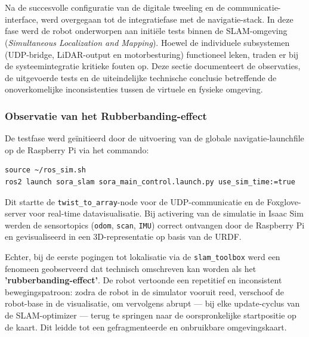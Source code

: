 \chapter{}%
\label{ch:diagnostische_analyse}

Na de succesvolle configuratie van de digitale tweeling en de communicatie-interface, werd overgegaan tot de integratiefase met de navigatie-stack. In deze fase werd de robot onderworpen aan initiële tests binnen de SLAM-omgeving (\textit{Simultaneous Localization and Mapping}). Hoewel de individuele subsystemen (UDP-bridge, LiDAR-output en motorbesturing) functioneel leken, traden er bij de systeemintegratie kritieke fouten op. Deze sectie documenteert de observaties, de uitgevoerde tests en de uiteindelijke technische conclusie betreffende de onoverkomelijke inconsistenties tussen de virtuele en fysieke omgeving.

\subsection{Observatie van het Rubberbanding-effect}
\label{subsec:observatie_rubberbanding}

De testfase werd geïnitieerd door de uitvoering van de globale navigatie-launchfile op de Raspberry Pi via het commando:
\begin{listing}[h]
\caption{Start commando raspberry pi voor simulatie.}
\label{lst:commando_simulatie}
\begin{verbatim}
source ~/ros_sim.sh
ros2 launch sora_slam sora_main_control.launch.py use_sim_time:=true
\end{verbatim}
\end{listing}

Dit startte de \texttt{twist\_to\_array}-node voor de UDP-communicatie en de Foxglove-server voor real-time datavisualisatie. Bij activering van de simulatie in Isaac Sim werden de sensortopics (\texttt{odom}, \texttt{scan}, \texttt{IMU}) correct ontvangen door de Raspberry Pi en gevisualiseerd in een 3D-representatie op basis van de URDF.

Echter, bij de eerste pogingen tot lokalisatie via de \texttt{slam\_toolbox} werd een fenomeen geobserveerd dat technisch omschreven kan worden als het \textbf{'rubberbanding-effect'}. De robot vertoonde een repetitief en inconsistent bewegingspatroon: zodra de robot in de simulator vooruit reed, verschoof de robot-base in de visualisatie, om vervolgens abrupt — bij elke update-cyclus van de SLAM-optimizer — terug te springen naar de oorspronkelijke startpositie op de kaart. Dit leidde tot een gefragmenteerde en onbruikbare omgevingskaart.

